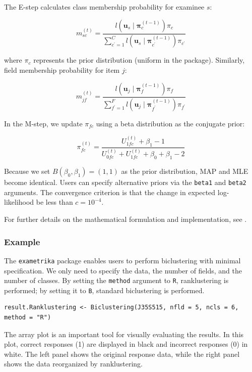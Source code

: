 The E-step calculates class membership probability for examinee \(s\):

\[
m_{s c}^{(t)}=\frac{l\left(\mathbf{u}_s \mid \boldsymbol{\pi}_c^{(t-1)}\right) \pi_c}{\sum_{c^{\prime}=1}^C l\left(\mathbf{u}_s \mid \boldsymbol{\pi}_{c^{\prime}}^{(t-1)}\right) \pi_{c^{\prime}}}
\]

where \(\pi_c\) represents the prior distribution (uniform in the package). Similarly, field membership probability for item \(j\):

\[
m_{j f}^{(t)}=\frac{l\left(\mathbf{u}_j \mid \boldsymbol{\pi}_f^{(t-1)}\right) \pi_f}{\sum_{f^{\prime}=1}^F l\left(\mathbf{u}_j \mid \boldsymbol{\pi}_{f^{\prime}}^{(t-1)}\right) \pi_{f^{\prime}}}
\]

In the M-step, we update \(\pi_{fc}\) using a beta distribution as the conjugate prior:

\[
\pi_{f c}^{(t)}=\frac{U_{1 f c}^{(t)}+\beta_1-1}{U_{0 f c}^{(t)}+U_{1 f c}^{(t)}+\beta_0+\beta_1-2}
\]

Because we set \(B(\beta_0, \beta_1)=(1,1)\) as the prior distribution, MAP and MLE become identical. Users can specify alternative priors via the \texttt{beta1} and \texttt{beta2} arguments. The convergence criterion is that the change in expected log-likelihood be less than \(c = 10^{-4}\).

For further details on the mathematical formulation and implementation, see \citet{shojima}.

\subsubsection{Example}\label{example-1}

The \texttt{exametrika} package enables users to perform biclustering with minimal specification. We only need to specify the data, the number of fields, and the number of classes. By setting the \texttt{method} argument to \texttt{R}, ranklustering is performed; by setting it to \texttt{B}, standard biclustering is performed.

\begin{verbatim}
result.Ranklustering <- Biclustering(J35S515, nfld = 5, ncls = 6, method = "R")
\end{verbatim}

The array plot is an important tool for visually evaluating the results. In this plot, correct responses (1) are displayed in black and incorrect responses (0) in white. The left panel shows the original response data, while the right panel shows the data reorganized by ranklustering.

